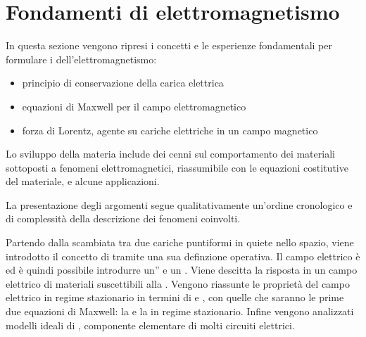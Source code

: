 \documentclass[letterpaper,10pt,italian]{jupyterBook}
\begin{document}
\chapter{Fondamenti di elettromagnetismo}
\label{\detokenize{ch/electromagnetism/em:fondamenti-di-elettromagnetismo}}\label{\detokenize{ch/electromagnetism/em:physics-hs-electromagnetism-em}}\label{\detokenize{ch/electromagnetism/em::doc}}
\sphinxAtStartPar
In questa sezione vengono ripresi i concetti e le esperienze fondamentali per formulare i  dell’elettromagnetismo:
\begin{itemize}
\item {} 
\sphinxAtStartPar
principio di conservazione della carica elettrica

\item {} 
\sphinxAtStartPar
equazioni di Maxwell per il campo elettromagnetico

\item {} 
\sphinxAtStartPar
forza di Lorentz, agente su cariche elettriche in un campo magnetico

\end{itemize}

\sphinxAtStartPar
Lo sviluppo della materia include dei cenni sul comportamento dei materiali sottoposti a fenomeni elettromagnetici, riassumibile con le equazioni costitutive del materiale, e alcune applicazioni.

\sphinxAtStartPar
La presentazione degli argomenti segue qualitativamente un’ordine cronologico e di complessità della descrizione dei fenomeni coinvolti.

\sphinxAtStartPar
{} Partendo dalla  scambiata tra due cariche puntiformi in quiete nello spazio, viene introdotto il concetto di  tramite una sua definzione operativa. Il campo elettrico è  ed è quindi possibile introdurre un” e un . Viene descitta la risposta in un campo elettrico di materiali suscettibili alla . Vengono riassunte le proprietà del campo elettrico in regime stazionario in termini di  e , con quelle che saranno le prime due equazioni di Maxwell: la  e la  in regime stazionario. Infine vengono analizzati modelli ideali di , componente elementare di molti circuiti elettrici.
\end{document}
